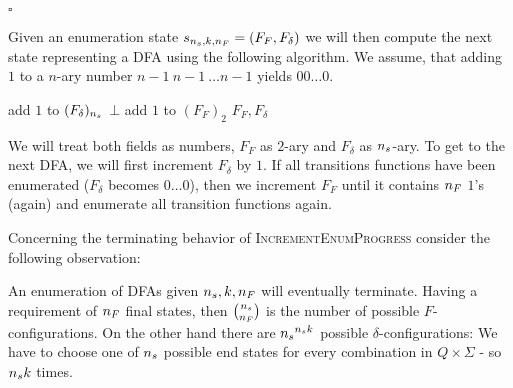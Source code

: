 \begin{example}
\begin{tabbing}
{
	}\end{tabbing}\vspace{-0.5cm}\hfill$\square$
\end{example}

\noindent Given an enumeration state $s_{{n_s}, k, {n_F}} = (F_F, F_\delta)$ we will then compute the next state representing a DFA using the following algorithm. We assume, that adding $1$ to a $n$-ary number $n-1\ n-1\ \ldots n-1$ yields $00\ldots0$.
\vspace{0.2cm}
\begin{algorithmic}[1]
	\State add $1$ to $(F_\delta)_{n_s}$
			\State \Return $\bot$
		\EndIf
			\State add $1$ to $(F_F)_2$
		\EndWhile
	\EndIf
	\State \Return $F_F, F_\delta$
	\EndFunction
\end{algorithmic}
\vspace{0.2cm} We will treat both fields as numbers, $F_F$ as $2$-ary and $F_\delta$ as ${n_s}$-ary. To get to the next DFA, we will first increment $F_\delta$ by $1$. If all transitions functions have been enumerated ($F_\delta$ becomes $0\ldots0$), then we increment $F_F$ until it contains ${n_F}$ $1$'s (again) and enumerate all transition functions again.

Concerning the terminating behavior of \textsc{IncrementEnumProgress} consider the following observation:


\begin{observation}
	An enumeration of DFAs given ${n_s}, k, {n_F}$ will eventually terminate. Having a requirement of ${n_F}$ final states, then $\binom{{n_s}}{{n_F}}$ is the number of possible $F$-configurations. On the other hand there are ${n_s}^{{n_s}k}$ possible $\delta$-configurations: We have to choose one of ${n_s}$ possible end states for every combination in $Q\times\Sigma$ - so ${n_s}k$ times.
\end{observation}

